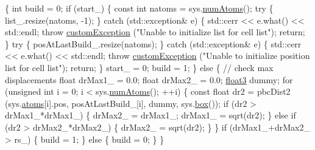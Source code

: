 \begin{DoxyCode}
                                                           \{
    \textcolor{keywordtype}{int} build = 0;
    \textcolor{keywordflow}{if} (start\_) \{
    \textcolor{keyword}{const} \textcolor{keywordtype}{int} natoms = sys.\hyperlink{classsystem_definition_ae8d3c2df2d56241cee03fcc4e2026ae0}{numAtoms}();
    \textcolor{keywordflow}{try} \{
            list\_.resize(natoms, -1);
        \} \textcolor{keywordflow}{catch} (std::exception& e) \{
            std::cerr << e.what() << std::endl;
            \textcolor{keywordflow}{throw} \hyperlink{classcustom_exception}{customException} (\textcolor{stringliteral}{"Unable to initialize list
       for cell list"});
            \textcolor{keywordflow}{return};
        \}
        \textcolor{keywordflow}{try} \{
            posAtLastBuild\_.resize(natoms);
        \} \textcolor{keywordflow}{catch} (std::exception& e) \{
            std::cerr << e.what() << std::endl;
            \textcolor{keywordflow}{throw} \hyperlink{classcustom_exception}{customException} (\textcolor{stringliteral}{"Unable to initialize
       position list for cell list"});
            \textcolor{keywordflow}{return};
        \}
        start\_ = 0;
        build = 1;
    \} \textcolor{keywordflow}{else} \{
        \textcolor{comment}{// check max displacements}
        \textcolor{keywordtype}{float} drMax1\_ = 0.0;
        \textcolor{keywordtype}{float} drMax2\_ = 0.0;
        \hyperlink{structfloat3}{float3} dummy;
            \textcolor{keywordflow}{for} (\textcolor{keywordtype}{unsigned} \textcolor{keywordtype}{int} i = 0; i < sys.\hyperlink{classsystem_definition_ae8d3c2df2d56241cee03fcc4e2026ae0}{numAtoms}(); ++i) \{
                \textcolor{keyword}{const} \textcolor{keywordtype}{float} dr2 = pbcDist2 (sys.\hyperlink{classsystem_definition_ae8814d3f60fc1111af2a3f218a4bfcab}{atoms}[i].pos, 
      posAtLastBuild\_[i], dummy, sys.\hyperlink{classsystem_definition_a85b80dee3609ddb68e370cee3fa959ea}{box}());
                \textcolor{keywordflow}{if} (dr2 > drMax1\_*drMax1\_) \{
                    drMax2\_ = drMax1\_;
                    drMax1\_ = sqrt(dr2);
                \} \textcolor{keywordflow}{else} \textcolor{keywordflow}{if} (dr2 > drMax2\_*drMax2\_) \{
                    drMax2\_ = sqrt(dr2);
                \}
            \}
        \textcolor{keywordflow}{if} (drMax1\_+drMax2\_ > rs\_) \{
            build = 1;
        \} \textcolor{keywordflow}{else} \{
            build = 0;
        \}
    \}


\end{DoxyCode}
